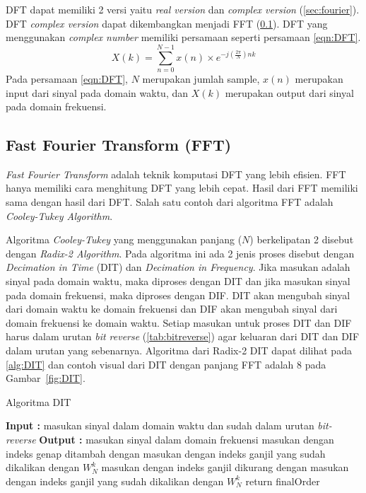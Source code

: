 DFT dapat memiliki 2 versi yaitu {\it real version} dan {\it complex version} (\ref{sec:fourier}). DFT {\it complex version} dapat dikembangkan menjadi FFT (\ref{subsec:fft}). DFT yang menggunakan {\it complex number} memiliki persamaan seperti persamaan \ref{eqn:DFT}.
	\begin{equation}\label{eqn:DFT}
		X(k) =\sum_{n=0}^{N-1}x(n)\times e^{-j(\frac{2\pi}{N})nk} 
	\end{equation}
Pada persamaan \ref{eqn:DFT}, $N$ merupakan jumlah sample, $x(n)$ merupakan input dari sinyal pada domain waktu, dan $X(k)$ merupakan output dari sinyal pada domain frekuensi. 


\subsection{Fast Fourier Transform (FFT) \cite{pariyal:0:differentFFT} \cite{sidney:0:fft}}
\label{subsec:fft}
{\it Fast Fourier Transform} adalah teknik komputasi DFT yang lebih efisien. FFT hanya memiliki cara menghitung DFT yang lebih cepat. Hasil dari FFT memiliki sama dengan hasil dari DFT. Salah satu contoh dari algoritma FFT adalah {\it Cooley-Tukey Algorithm}. 

Algoritma {\it Cooley-Tukey} yang menggunakan panjang ($N$) berkelipatan 2 disebut dengan {\it Radix-2 Algorithm}. Pada algoritma ini ada 2 jenis proses disebut dengan {\it Decimation in Time} (DIT) dan {\it Decimation in Frequency}. Jika masukan adalah sinyal pada domain waktu, maka 
diproses dengan DIT dan jika masukan sinyal pada domain frekuensi, maka diproses dengan DIF. DIT akan mengubah sinyal dari domain waktu ke domain frekuensi dan DIF akan mengubah sinyal dari domain frekuensi ke domain waktu. Setiap masukan untuk proses DIT dan DIF harus dalam urutan {\it bit reverse} (\ref{tab:bitreverse}) agar keluaran dari DIT dan DIF dalam urutan yang sebenarnya. Algoritma dari Radix-2 DIT dapat dilihat pada \ref{alg:DIT} dan contoh visual dari DIT dengan panjang FFT adalah 8 pada Gambar~\ref{fig:DIT}.

\begin{algorithm}[htbp]
	\label{alg:DIT}
		\caption{Algoritma DIT}
		\begin{algorithmic}[1]
		\State \textbf{Input  :} masukan sinyal dalam domain waktu dan sudah dalam urutan {\it bit-reverse}
		\State \textbf{Output :} masukan sinyal dalam domain frekuensi	
						\State  masukan dengan indeks genap ditambah dengan 
								masukan dengan indeks ganjil yang sudah dikalikan dengan $W^k_N$ 	
						\State masukan dengan indeks ganjil dikurang dengan
							   masukan dengan indeks ganjil yang sudah dikalikan dengan $W^k_N$
					\EndFor				
				\EndFor		
			\EndFor
			\State return finalOrder
	\end{algorithmic}
	\end{algorithm}

